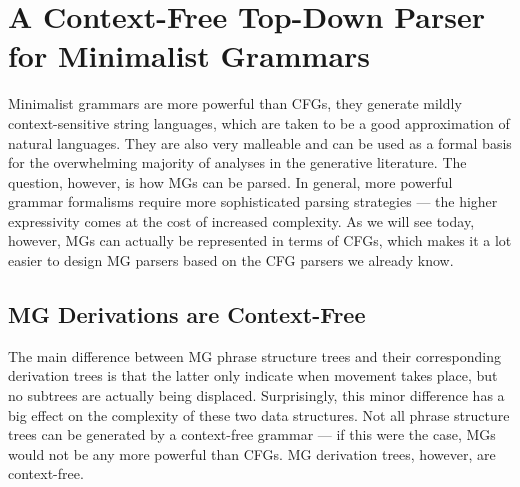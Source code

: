 \chapter{A Context-Free Top-Down Parser for Minimalist Grammars}
\label{cha:MG-TopDown}

Minimalist grammars are more powerful than CFGs, they generate mildly context-sensitive string languages, which are taken to be a good approximation of natural languages.
They are also very malleable and can be used as a formal basis for the overwhelming majority of analyses in the generative literature.
The question, however, is how MGs can be parsed.
In general, more powerful grammar formalisms require more sophisticated parsing strategies --- the higher expressivity comes at the cost of increased complexity.
As we will see today, however, MGs can actually be represented in terms of CFGs, which makes it a lot easier to design MG parsers based on the CFG parsers we already know.

\section{MG Derivations are Context-Free}
\label{sec:MG-TopDown_FeatureDerivationTrees}

The main difference between MG phrase structure trees and their corresponding derivation trees is that the latter only indicate when movement takes place, but no subtrees are actually being displaced.
Surprisingly, this minor difference has a big effect on the complexity of these two data structures.
Not all phrase structure trees can be generated by a context-free grammar --- if this were the case, MGs would not be any more powerful than CFGs.
MG derivation trees, however, are context-free.

